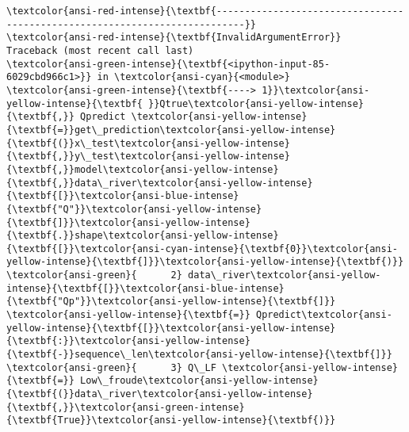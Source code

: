 \documentclass[11pt]{article}
\begin{document}
    \begin{Verbatim}[commandchars=\\\{\}, frame=single, framerule=2mm, rulecolor=\color{outerrorbackground}]
\textcolor{ansi-red-intense}{\textbf{---------------------------------------------------------------------------}}
\textcolor{ansi-red-intense}{\textbf{InvalidArgumentError}}                      Traceback (most recent call last)
\textcolor{ansi-green-intense}{\textbf{<ipython-input-85-6029cbd966c1>}} in \textcolor{ansi-cyan}{<module>}
\textcolor{ansi-green-intense}{\textbf{----> 1}}\textcolor{ansi-yellow-intense}{\textbf{ }}Qtrue\textcolor{ansi-yellow-intense}{\textbf{,}} Qpredict \textcolor{ansi-yellow-intense}{\textbf{=}}get\_prediction\textcolor{ansi-yellow-intense}{\textbf{(}}x\_test\textcolor{ansi-yellow-intense}{\textbf{,}}y\_test\textcolor{ansi-yellow-intense}{\textbf{,}}model\textcolor{ansi-yellow-intense}{\textbf{,}}data\_river\textcolor{ansi-yellow-intense}{\textbf{[}}\textcolor{ansi-blue-intense}{\textbf{"Q"}}\textcolor{ansi-yellow-intense}{\textbf{]}}\textcolor{ansi-yellow-intense}{\textbf{.}}shape\textcolor{ansi-yellow-intense}{\textbf{[}}\textcolor{ansi-cyan-intense}{\textbf{0}}\textcolor{ansi-yellow-intense}{\textbf{]}}\textcolor{ansi-yellow-intense}{\textbf{)}}
\textcolor{ansi-green}{      2} data\_river\textcolor{ansi-yellow-intense}{\textbf{[}}\textcolor{ansi-blue-intense}{\textbf{"Qp"}}\textcolor{ansi-yellow-intense}{\textbf{]}} \textcolor{ansi-yellow-intense}{\textbf{=}} Qpredict\textcolor{ansi-yellow-intense}{\textbf{[}}\textcolor{ansi-yellow-intense}{\textbf{:}}\textcolor{ansi-yellow-intense}{\textbf{-}}sequence\_len\textcolor{ansi-yellow-intense}{\textbf{]}}
\textcolor{ansi-green}{      3} Q\_LF \textcolor{ansi-yellow-intense}{\textbf{=}} Low\_froude\textcolor{ansi-yellow-intense}{\textbf{(}}data\_river\textcolor{ansi-yellow-intense}{\textbf{,}}\textcolor{ansi-green-intense}{\textbf{True}}\textcolor{ansi-yellow-intense}{\textbf{)}}


\end{Verbatim}
\end{document}
